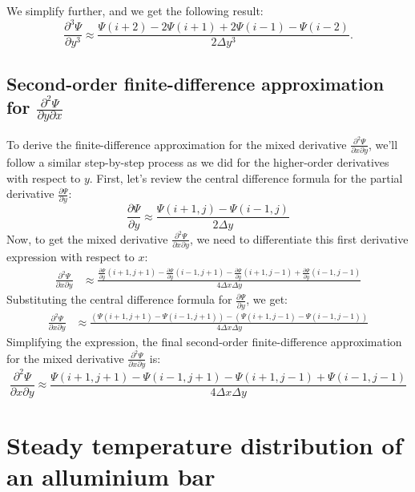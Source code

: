 \documentclass{article}
\begin{document}
We simplify further, and we get the following result:
\begin{equation}
\frac{\partial^3 \Psi}{\partial y^3} \approx \frac{\Psi(i+2) - 2\Psi(i+1) + 2\Psi(i-1) - \Psi(i-2)}{2\Delta y^3}.
\end{equation}


\subsection{Second-order finite-difference approximation for \texorpdfstring{$\frac{\partial^2 \Psi}{\partial y \partial x}$}{d2Psi/dy dx}}
To derive the finite-difference approximation for the mixed derivative $\frac{\partial^2\Psi}{\partial x\partial y}$, we'll follow a similar step-by-step process as we did for the higher-order derivatives with respect to $y$.
First, let's review the central difference formula for the partial derivative $\frac{\partial\Psi}{\partial y}$:
\begin{equation}
\frac{\partial\Psi}{\partial y} \approx \frac{\Psi(i+1,j) - \Psi(i-1,j)}{2\Delta y}
\end{equation}
Now, to get the mixed derivative $\frac{\partial^2\Psi}{\partial x\partial y}$, we need to differentiate this first derivative expression with respect to $x$:
\begin{align}
\frac{\partial^2\Psi}{\partial x\partial y} &\approx \frac{\frac{\partial\Psi}{\partial y}(i+1,j+1) - \frac{\partial\Psi}{\partial y}(i-1,j+1) - \frac{\partial\Psi}{\partial y}(i+1,j-1) + \frac{\partial\Psi}{\partial y}(i-1,j-1)}{4\Delta x\Delta y}
\end{align}
Substituting the central difference formula for $\frac{\partial\Psi}{\partial y}$, we get:
\begin{align}
\frac{\partial^2\Psi}{\partial x\partial y} &\approx \frac{(\Psi(i+1,j+1) - \Psi(i-1,j+1)) - (\Psi(i+1,j-1) - \Psi(i-1,j-1))}{4\Delta x\Delta y}
\end{align}
Simplifying the expression, the final second-order finite-difference approximation for the mixed derivative $\frac{\partial^2\Psi}{\partial x\partial y}$ is:
\begin{equation}
\frac{\partial^2\Psi}{\partial x\partial y} \approx \frac{\Psi(i+1,j+1) - \Psi(i-1,j+1) - \Psi(i+1,j-1) + \Psi(i-1,j-1)}{4\Delta x\Delta y}
\end{equation}

\section{Steady temperature distribution of an alluminium bar}
\end{document}
